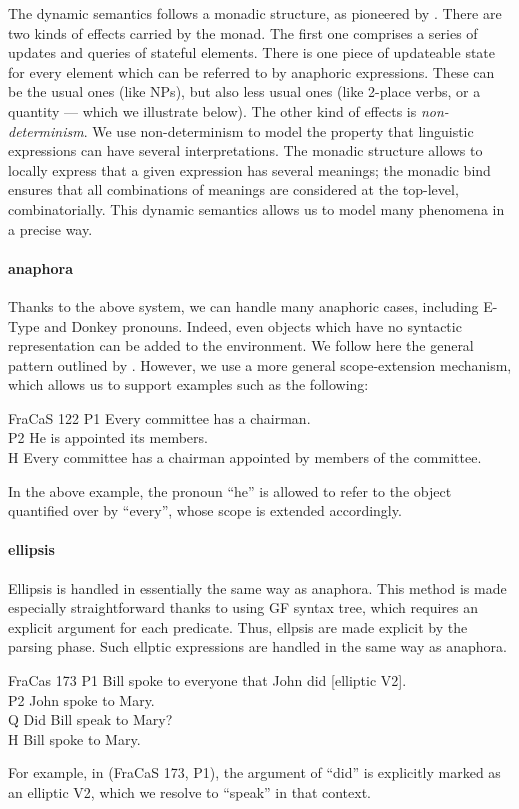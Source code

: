 \documentclass{article}
\begin{document}
The dynamic semantics follows a monadic structure, as pioneered by
\citet{Shan:2002}. There are two kinds of effects carried by the
monad.  The first one comprises a series of updates and queries of
stateful elements.  There is one piece of updateable state for every
element which can be referred to by anaphoric expressions. These can
be the usual ones (like NPs), but also less usual ones (like 2-place
verbs, or a quantity --- which we illustrate below). The other kind of
effects is \emph{non-determinism}. We use non-determinism to model the
property that linguistic expressions can have several
interpretations. The monadic structure allows to locally express that
a given expression has several meanings; the monadic bind ensures that
all combinations of meanings are considered at the top-level,
combinatorially. This dynamic semantics allows us to model many
phenomena in a precise way.

\paragraph{anaphora} Thanks to the above system, we can handle many
anaphoric cases, including E-Type and Donkey pronouns. Indeed, even
objects which have no syntactic representation can be added to the
environment. We follow here the general pattern outlined by
\citet{unger:2011}. However, we use a more general scope-extension
mechanism, which allows us to support examples such as the following:
\begin{lingex}
\item[FraCaS 122]
P1	Every committee has a chairman.\\
P2	He is appointed its members.\\
H 	Every committee has a chairman appointed by members of the committee. 
\end{lingex}
In the above example, the pronoun ``he'' is allowed to refer to the
object quantified over by ``every'', whose scope is extended
accordingly.

\paragraph{ellipsis} Ellipsis is handled in essentially the same way
as anaphora. This method is made especially straightforward thanks to
using GF syntax tree, which requires an explicit argument for each
predicate. Thus, ellpsis are made explicit by the parsing phase. Such
ellptic expressions are handled in the same way as anaphora.
\begin{lingex}
\item[FraCas 173]
  P1	Bill spoke to everyone that John did [elliptic V2].\\
  P2	John spoke to Mary.\\
  Q 	Did Bill speak to Mary?\\
  H 	Bill spoke to Mary.
\end{lingex}
For example, in (FraCaS 173, P1), the argument of ``did'' is
explicitly marked as an elliptic V2, which we resolve to ``speak'' in
that context.
\end{document}
